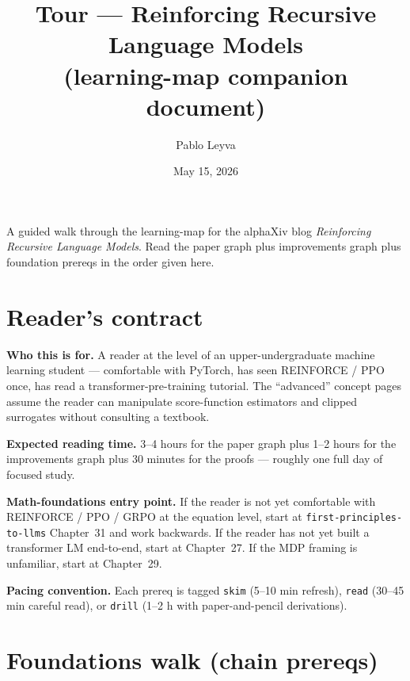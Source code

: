 \documentclass[11pt]{article}
\title{Tour --- Reinforcing Recursive Language Models\\
       (learning-map companion document)}
\author{Pablo Leyva}
\date{May 15, 2026}
\begin{document}
\maketitle

A guided walk through the learning-map for the alphaXiv blog
\emph{Reinforcing Recursive Language Models}. Read the paper graph plus
improvements graph plus foundation prereqs in the order given here.

\section{Reader's contract}

\textbf{Who this is for.} A reader at the level of an upper-undergraduate
machine learning student --- comfortable with PyTorch, has seen REINFORCE / PPO
once, has read a transformer-pre-training tutorial. The ``advanced'' concept
pages assume the reader can manipulate score-function estimators and clipped
surrogates without consulting a textbook.

\textbf{Expected reading time.} 3--4 hours for the paper graph plus 1--2 hours
for the improvements graph plus 30 minutes for the proofs --- roughly one full
day of focused study.

\textbf{Math-foundations entry point.} If the reader is not yet comfortable
with REINFORCE / PPO / GRPO at the equation level, start at
\texttt{first-principles-to-llms} Chapter~31 and work backwards. If the reader
has not yet built a transformer LM end-to-end, start at Chapter~27. If the MDP
framing is unfamiliar, start at Chapter~29.

\textbf{Pacing convention.} Each prereq is tagged \texttt{skim} (5--10 min
refresh), \texttt{read} (30--45 min careful read), or \texttt{drill} (1--2 h
with paper-and-pencil derivations).

\section{Foundations walk (chain prereqs)}
\end{document}
